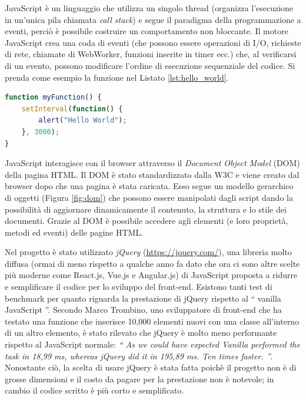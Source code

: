 \documentclass[12pt]{report}
\begin{document}
JavaScript è un linguaggio che utilizza un singolo thread (organizza l'esecuzione in un'unica pila chiamata \emph{call stack}) e segue il paradigma della programmazione a eventi, perciò è possibile costruire un comportamento non bloccante. Il motore JavaScript crea una coda di eventi (che possono essere operazioni di I/O, richieste di rete, chiamate di WebWorker, funzioni inserite in timer ecc.) che, al verificarsi di un evento, possono modificare l'ordine di esecuzione sequenziale del codice. Si prenda come esempio la funzione nel Listato \ref{lst:hello_world}.
\begin{lstlisting}[language=JavaScript, morekeywords={ alert }, caption={Programmazione a eventi: funzione che scrive \textquotedblleft{} Hello World \textquotedblright{} ogni 3 secondi (in questo caso l'evento è rappresentato dal timer)},label={lst:hello_world}]
function myFunction() {
	setInterval(function() { 
		alert("Hello World"); 
	}, 3000);
}
\end{lstlisting}

JavaScript interagisce con il browser attraverso il \emph{Document Object Model} (DOM) della pagina HTML. Il DOM è stato standardizzato dalla W3C e viene creato dal browser dopo che una pagina è stata caricata. Esso segue un modello gerarchico di oggetti (Figura \ref{fig:dom}) che possono essere manipolati dagli script dando la possibilità di aggiornare dinamicamente il contenuto, la struttura e lo stile dei documenti. Grazie al DOM è possibile accedere agli elementi (e loro proprietà, metodi ed eventi) delle pagine HTML.

Nel progetto è stato utilizzato \emph{jQuery} (\url{https://jquery.com/}), una libreria molto diffusa (ormai di meno rispetto a qualche anno fa dato che ora ci sono altre scelte più moderne come React.js, Vue.js e Angular.js) di JavaScript proposta a ridurre e semplificare il codice per lo sviluppo del front-end. Esistono tanti test di benchmark per quanto riguarda la prestazione di jQuery rispetto al \textquotedblleft{} vanilla JavaScript \textquotedblright{}. Secondo Marco Trombino, uno sviluppatore di front-end che ha testato una funzione che inserisce 10,000 elementi nuovi con una classe all'interno di un altro elemento, è stato rilevato che jQuery è molto meno performante rispetto al JavaScript normale: \textit{\textquotedblleft{} As we could have expected Vanilla performed the task in 18,99 ms, whereas jQuery did it in 195,89 ms. Ten times faster. \textquotedblright{}}\cite{jquery}. Nonostante ciò, la scelta di usare jQuery è stata fatta poichè il progetto non è di grosse dimensioni e il costo da pagare per la prestazione non è notevole; in cambio il codice scritto è più corto e semplificato. 
\end{document}
